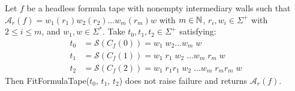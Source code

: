 

\begin{theorem}\label{th:greedy-formula-tape-fitting}
    Let $f$ be a headless formula tape with nonempty intermediary walls such that $\mathcal{A}_r(f) = w_1 (r_1) w_2 (r_2)\dots w_m (r_m) w$ with $m\in\mathbb{N}$, $r_i, w_i \in \Sigma^+$ with $2 \leq i \leq m$, and $w_1, w \in \Sigma^*$. Take $t_0, t_1, t_2 \in \Sigma^+$ satisfying:
    \begin{align*}
        t_0 & = \mathcal{S}(C_f(0))  = w_1\; w_2 \dots w_m\; w                       \\
        t_1 & = \mathcal{S}(C_f(1))  = w_1\; r_1\; w_2\; \dots w_m\; r_m\; w         \\
        t_2 & = \mathcal{S}(C_f(2))  = w_1\; r_1 r_1\; w_2\; \dots w_m\; r_m r_m\; w
    \end{align*}
    Then {\sc FitFormulaTape}($t_0$, $t_1$, $t_2$) does not raise failure and returns $\mathcal{A}_r(f)$.

\end{theorem}
